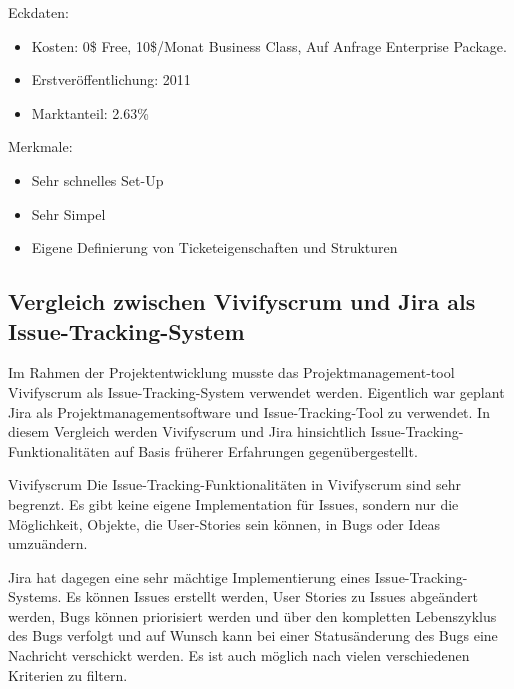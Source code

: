 Eckdaten:
\begin{itemize}
	\item Kosten: 0\$ Free, 10\$/Monat Business Class, Auf Anfrage Enterprise Package.
	\item Erstveröffentlichung: 2011
	\item Marktanteil: 2.63\%
\end{itemize}		
Merkmale:
\begin{itemize}
	\item Sehr schnelles Set-Up
	\item Sehr Simpel
	\item Eigene Definierung von Ticketeigenschaften und Strukturen
\end{itemize}			
\subsection{Vergleich zwischen Vivifyscrum und Jira als Issue-Tracking-System}				
Im Rahmen der Projektentwicklung musste das Projektmanagement-tool Vivifyscrum als Issue-Tracking-System verwendet werden. Eigentlich war geplant Jira als Projektmanagementsoftware und Issue-Tracking-Tool zu verwendet. In diesem Vergleich werden Vivifyscrum und Jira hinsichtlich Issue-Tracking-Funktionalitäten auf Basis früherer Erfahrungen gegenübergestellt. 

Vivifyscrum
Die Issue-Tracking-Funktionalitäten in Vivifyscrum sind sehr begrenzt. Es gibt keine eigene Implementation für Issues, sondern nur die Möglichkeit, Objekte, die User-Stories sein können, in Bugs oder Ideas umzuändern.

Jira hat dagegen eine sehr mächtige Implementierung eines Issue-Tracking-Systems. Es können Issues erstellt werden, User Stories zu Issues abgeändert werden, Bugs können priorisiert werden und über den kompletten Lebenszyklus des Bugs verfolgt und auf Wunsch kann bei einer Statusänderung des Bugs eine Nachricht verschickt werden. Es ist auch möglich nach vielen verschiedenen Kriterien zu filtern.  